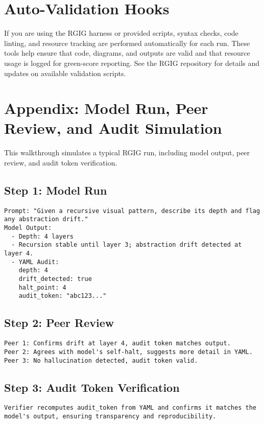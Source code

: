 \section*{Auto-Validation Hooks}
If you are using the RGIG harness or provided scripts, syntax checks, code linting, and resource tracking are performed automatically for each run. These tools help ensure that code, diagrams, and outputs are valid and that resource usage is logged for green-score reporting. See the RGIG repository for details and updates on available validation scripts.

\appendix
\section*{Appendix: Model Run, Peer Review, and Audit Simulation}
This walkthrough simulates a typical RGIG run, including model output, peer review, and audit token verification.

\subsection*{Step 1: Model Run}
\begin{verbatim}
Prompt: "Given a recursive visual pattern, describe its depth and flag any abstraction drift."
Model Output:
  - Depth: 4 layers
  - Recursion stable until layer 3; abstraction drift detected at layer 4.
  - YAML Audit:
    depth: 4
    drift_detected: true
    halt_point: 4
    audit_token: "abc123..."
\end{verbatim}

\subsection*{Step 2: Peer Review}
\begin{verbatim}
Peer 1: Confirms drift at layer 4, audit token matches output.
Peer 2: Agrees with model's self-halt, suggests more detail in YAML.
Peer 3: No hallucination detected, audit token valid.
\end{verbatim}

\subsection*{Step 3: Audit Token Verification}
\begin{verbatim}
Verifier recomputes audit_token from YAML and confirms it matches the model's output, ensuring transparency and reproducibility.
\end{verbatim}

